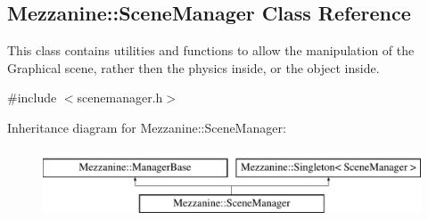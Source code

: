 \hypertarget{classMezzanine_1_1SceneManager}{
\subsection{Mezzanine::SceneManager Class Reference}
\label{classMezzanine_1_1SceneManager}
}


This class contains utilities and functions to allow the manipulation of the Graphical scene, rather then the physics inside, or the object inside.  




{\ttfamily \#include $<$scenemanager.h$>$}

Inheritance diagram for Mezzanine::SceneManager:\begin{figure}[H]
\begin{center}
\leavevmode
\includegraphics[height=2.000000cm]{classMezzanine_1_1SceneManager}
\end{center}
\end{figure}
